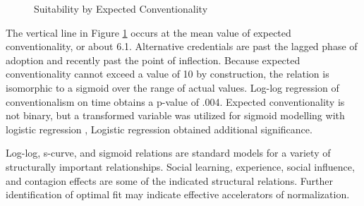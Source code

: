 \documentclass[AER]{./aea-latex-templates/AEA}
\begin{document}
        \begin{figure}[h!]
            \centering
            \caption{Suitability by Expected Conventionality}
            
        
            \label{fig:expect_convention_voi}
            \end{figure}
        
        The vertical line in Figure \ref{fig:expect_convention_voi} occurs at the mean value of expected conventionality, or about 6.1.
        Alternative credentials are past the lagged phase of adoption and recently past the
        point of inflection. Because expected conventionality cannot exceed a value of 10 by
        construction, the relation is isomorphic to a sigmoid over the range of actual values.
        Log-log regression of conventionalism on time obtains a p-value of .004.
        Expected conventionality is not binary,
        but a transformed variable was utilized for sigmoid modelling with logistic regression \cite{cox2008stata},
        Logistic regression obtained additional significance.
        
        Log-log, s-curve, and sigmoid relations are standard models for a variety of structurally important relationships.
        Social learning, experience, social influence, and contagion effects are some of the
        indicated structural relations\cite{young2009innovation}.
        Further identification of optimal fit may indicate effective accelerators of normalization.
        
\end{document}
